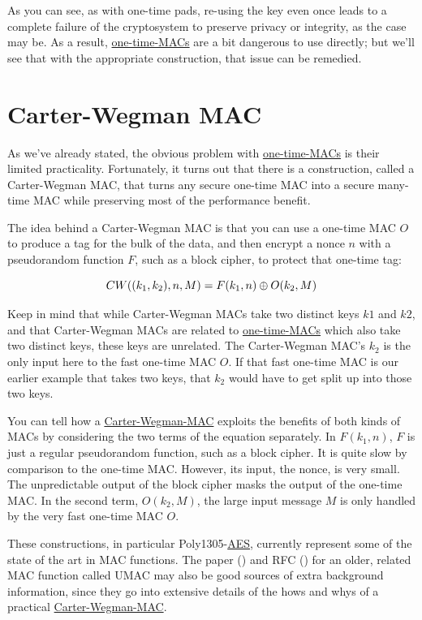 \documentclass[11pt,ebook,table,dvipsnames]{memoir}
\begin{document}
As you can see, as with one-time pads, re-using the key even once
leads to a complete failure of the cryptosystem to preserve privacy or
integrity, as the case may be. As a result, \hyperref[One-time MACs]{one-time-MACs} are a bit
dangerous to use directly; but we'll see that with the appropriate
construction, that issue can be remedied.
\section{\label{Carter-Wegman-MAC}Carter-Wegman MAC}
\label{sec-2-7-6}

As we've already stated, the obvious problem with \hyperref[One-time MACs]{one-time-MACs} is
their limited practicality. Fortunately, it turns out that there is a
construction, called a \gls{Carter-Wegman MAC}, that turns any secure
one-time MAC into a secure many-time MAC while preserving most of the
performance benefit.

The idea behind a \gls{Carter-Wegman MAC} is that you can use a
one-time MAC $O$ to produce a tag for the bulk of the data, and then
encrypt a nonce $n$ with a pseudorandom function $F$, such as a block
cipher, to protect that one-time tag:

\[
CW((k_1, k_2), n, M) = F(k_1, n) \oplus O(k_2, M)
\]

Keep in mind that while Carter-Wegman MACs take two distinct keys $k1$
and $k2$, and that Carter-Wegman MACs are related to \hyperref[One-time MACs]{one-time-MACs}
which also take two distinct keys, these keys are unrelated. The
Carter-Wegman MAC's $k_2$ is the only input here to the fast one-time
MAC $O$. If that fast one-time MAC is our earlier example that takes
two keys, that $k_2$ would have to get split up into those two keys.

You can tell how a \hyperref[Carter-Wegman MAC]{Carter-Wegman-MAC} exploits the benefits of both
kinds of MACs by considering the two terms of the equation separately.
In $F(k_1, n)$, $F$ is just a regular pseudorandom function, such as a
block cipher. It is quite slow by comparison to the one-time MAC.
However, its input, the nonce, is very small. The unpredictable output
of the block cipher masks the output of the one-time MAC. In the
second term, $O(k_2, M)$, the large input message $M$ is only handled
by the very fast one-time MAC $O$.

These constructions, in particular Poly1305-\hyperref[AES]{AES}, currently represent
some of the state of the art in MAC functions. The paper (\cite{umac})
and RFC (\cite{rfc4418}) for an older, related MAC function called
UMAC may also be good sources of extra background information, since
they go into extensive details of the hows and whys of a practical
\hyperref[Carter-Wegman MAC]{Carter-Wegman-MAC}.
\end{document}
